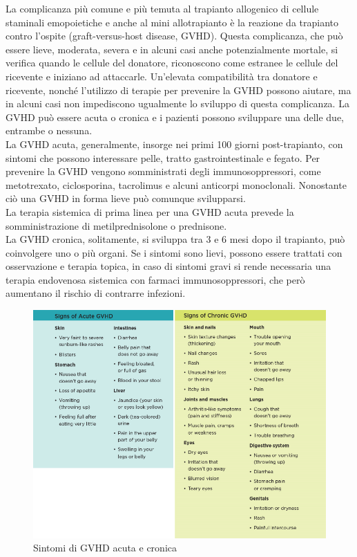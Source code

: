 La complicanza più comune e più temuta al trapianto allogenico di cellule staminali emopoietiche e anche al mini 
allotrapianto è la reazione da trapianto contro l’ospite (graft-versus-host disease, GVHD). Questa complicanza, 
che può essere lieve, moderata, severa e in alcuni casi anche potenzialmente mortale, si verifica quando le cellule 
del donatore, riconoscono come estranee le cellule del ricevente e iniziano ad attaccarle. Un’elevata compatibilità 
tra donatore e ricevente, nonché l’utilizzo di terapie per prevenire la GVHD possono aiutare, ma in alcuni casi non 
impediscono ugualmente lo sviluppo di questa complicanza. 
La GVHD può essere acuta o cronica e i pazienti possono sviluppare una delle due, entrambe o nessuna\cite{LLSBLOOD}.\\
La GVHD acuta, generalmente, insorge nei primi 100 giorni post-trapianto, con sintomi che possono interessare pelle, 
tratto gastrointestinale e fegato. Per prevenire la GVHD vengono somministrati degli immunosoppressori, come 
metotrexato, ciclosporina, tacrolimus e alcuni anticorpi monoclonali. 
Nonostante ciò una GVHD in forma lieve può comunque svilupparsi\cite{STEMCELLS}.\\
La terapia sistemica di prima linea per una GVHD acuta prevede la somministrazione di metilprednisolone o prednisone\cite{GVHD}.\\
La GVHD cronica, solitamente, si sviluppa tra 3 e 6 mesi dopo il trapianto, può coinvolgere uno o più organi. 
Se i sintomi sono lievi, possono essere trattati con osservazione e terapia topica, in caso di sintomi gravi si rende 
necessaria una terapia endovenosa sistemica con farmaci immunosoppressori, che però aumentano il rischio 
di contrarre infezioni\cite{STEMCELLS}.\\

\begin{figure}[H]
    \begin{center}
    \includegraphics[width=0.8\columnwidth]{img/Signs of Acute and Chronic GVHD.png}
    \end{center}
    \caption[Sintomi di GVHD acuta e cronica]{Sintomi di GVHD acuta e cronica
    \cite{img38}}

\end{figure}

